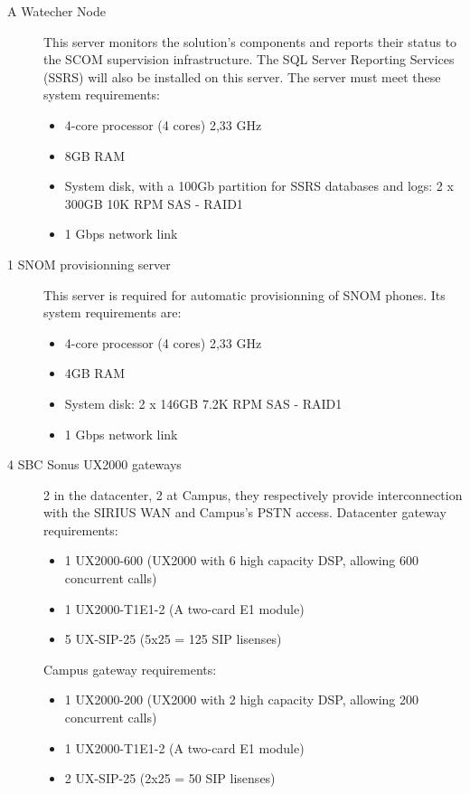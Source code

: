 \begin{description}
		\item[A Watecher Node] This server monitors the solution's components and reports their status to the SCOM supervision infrastructure. The SQL Server Reporting Services (SSRS) will also be installed on this server.
		The server must meet these system requirements:
		\begin{itemize}
			\item 4-core processor (4 cores) 2,33 GHz
			\item 8GB RAM
			\item System disk, with a 100Gb partition for SSRS databases and logs: 2 x 300GB 10K RPM SAS - RAID1
			\item 1 Gbps network link
		\end{itemize}
		
		\item[1 SNOM provisionning server] This server is required for automatic provisionning of SNOM phones.
		Its system requirements are:
		\begin{itemize}
			\item 4-core processor (4 cores) 2,33 GHz
			\item 4GB RAM
			\item System disk: 2 x 146GB 7.2K RPM SAS - RAID1
			\item 1 Gbps network link
		\end{itemize}
		
		\item[4 SBC Sonus UX2000 gateways] 2 in the datacenter, 2 at Campus, they respectively provide interconnection with the SIRIUS WAN and Campus's PSTN access.
		Datacenter gateway requirements:
		\begin{itemize}
			\item 1 UX2000-600 (UX2000 with 6 high capacity DSP, allowing 600 concurrent calls)
			\item 1 UX2000-T1E1-2 (A two-card E1 module)
			\item 5 UX-SIP-25 (5x25 = 125 SIP lisenses)
		\end{itemize}
		Campus gateway requirements:
		\begin{itemize}
			\item 1 UX2000-200 (UX2000 with 2 high capacity DSP, allowing 200 concurrent calls)
			\item 1 UX2000-T1E1-2 (A two-card E1 module)
			\item 2 UX-SIP-25 (2x25 = 50 SIP lisenses)
		\end{itemize}
		

\end{description}
